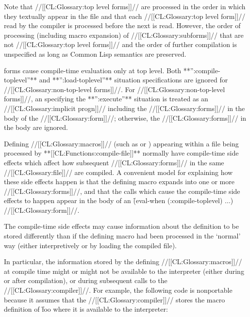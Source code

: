 Note that //[[CL:Glossary:top level forms]]// are processed in the order in
which they textually appear in the file and that each 
//[[CL:Glossary:top level form]]// read by the compiler is processed before the next is
read.  However, the order of processing (including macro expansion) of
//[[CL:Glossary:subforms]]// that are not //[[CL:Glossary:top level forms]]// and the order of
further compilation is unspecified as long as Common Lisp semantics
are preserved.

\endlist 
 
 forms cause compile-time evaluation only at
top level.  Both **'':compile-toplevel''** and **'':load-toplevel''** situation specifications
are ignored for //[[CL:Glossary:non-top-level forms]]//. For //[[CL:Glossary:non-top-level forms]]//, 
an 
specifying the **'':execute''** situation is treated as an //[[CL:Glossary:implicit progn]]//
including the //[[CL:Glossary:forms]]// in the body of the  //[[CL:Glossary:form]]//;
otherwise, the //[[CL:Glossary:forms]]// in the body are ignored.






Defining //[[CL:Glossary:macros]]// (such as  or )
appearing within a file being processed by **[[CL:Functions:compile-file]]**
normally have compile-time side effects which affect how subsequent //[[CL:Glossary:forms]]//
in the same //[[CL:Glossary:file]]// are compiled.  A convenient model for explaining how these
side effects happen is that the defining macro expands into one or
more  //[[CL:Glossary:forms]]//, and that the calls which cause the compile-time
side effects to happen appear 
in the body of an \f{(eval-when (:compile-toplevel) ...)} //[[CL:Glossary:form]]//.






The compile-time side effects may cause information about the definition to
be stored differently than if the defining macro had been processed in the
`normal' way (either interpretively or by loading the compiled file).

In particular, the information stored by the defining //[[CL:Glossary:macros]]// at compile time
might or might not be available to the interpreter (either during or after compilation),
or during subsequent calls to the //[[CL:Glossary:compiler]]//.  For example,
the following code is nonportable because it assumes that the //[[CL:Glossary:compiler]]//
stores the macro definition of \f{foo} where it is available to the interpreter:
    
